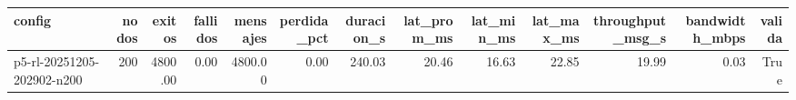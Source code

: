 \begin{tabular}{lrrrrrrrrrrrr}
\toprule
config & nodos & exitos & fallidos & mensajes & perdida_pct & duracion_s & lat_prom_ms & lat_min_ms & lat_max_ms & throughput_msg_s & bandwidth_mbps & valida \\
\midrule
p5-rl-20251205-202902-n200 & 200 & 4800.00 & 0.00 & 4800.00 & 0.00 & 240.03 & 20.46 & 16.63 & 22.85 & 19.99 & 0.03 & True \\
\bottomrule
\end{tabular}
